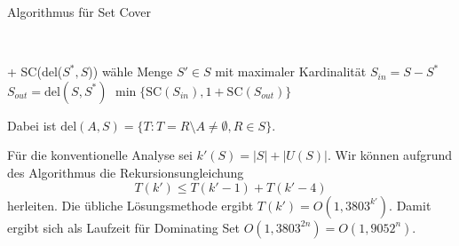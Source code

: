   \begin{algorithm}[H]
    \caption{Algorithmus für Set Cover}

     \\
    \KwResult{}

     {
       + SC(del(\(S^*, S\)))
    }
    wähle Menge \(S' \in S\) mit maximaler Kardinalität \;
     {
      \(S_{in} = S - S^*\)\;
      \(S_{out} = \text{del}(S, S^*)\)\;
      \Return \(\min\{ \text{SC}(S_{in}), 1 + \text{SC}(S_{out}) \}\)
    }
  \end{algorithm}

  Dabei ist \(\text{del}(A,S) = \{ T : T = R \setminus A \neq \emptyset, R \in S \}\).

  Für die konventionelle Analyse sei \(k'(S) = |S| + |U(S)|\). Wir können aufgrund des Algorithmus die Rekursionsungleichung
  \[ T(k') \leq T(k' - 1) + T(k' - 4) \]
  herleiten. Die übliche Lösungsmethode ergibt \(T(k') = O(1,3803^{k'})\). Damit ergibt sich als Laufzeit für Dominating Set \(O(1,3803^{2n}) = O(1,9052^n)\).

